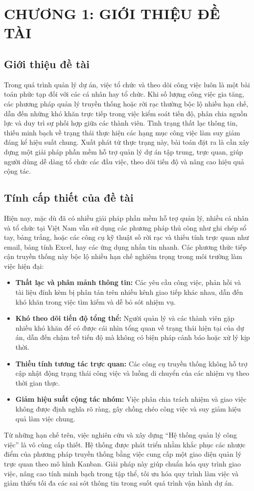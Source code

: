 \section{CHƯƠNG 1: GIỚI THIỆU ĐỀ TÀI}

\subsection{Giới thiệu đề tài}
Trong quá trình quản lý dự án, việc tổ chức và theo dõi công việc luôn là một bài toán phức tạp đối với các cá nhân hay tổ chức. Khi số lượng công việc gia tăng, các phương pháp quản lý truyền thống hoặc rời rạc thường bộc lộ nhiều hạn chế, dẫn đến những khó khăn trực tiếp trong việc kiểm soát tiến độ, phân chia nguồn lực và duy trì sự phối hợp giữa các thành viên. Tình trạng thất lạc thông tin, thiếu minh bạch về trạng thái thực hiện các hạng mục công việc làm suy giảm đáng kể hiệu suất chung. Xuất phát từ thực trạng này, bài toán đặt ra là cần xây dựng một giải pháp phần mềm hỗ trợ quản lý dự án tập trung, trực quan, giúp người dùng dễ dàng tổ chức các đầu việc, theo dõi tiến độ và nâng cao hiệu quả cộng tác.

\subsection{Tính cấp thiết của đề tài}
Hiện nay, mặc dù đã có nhiều giải pháp phần mềm hỗ trợ quản lý, nhiều cá nhân và tổ chức tại Việt Nam vẫn sử dụng các phương pháp thủ công như ghi chép sổ tay, bảng trắng, hoặc các công cụ kỹ thuật số rời rạc và thiếu tính trực quan như email, bảng tính Excel, hay các ứng dụng nhắn tin nhanh. Các phương thức tiếp cận truyền thống này bộc lộ nhiều hạn chế nghiêm trọng trong môi trường làm việc hiện đại:
\begin{itemize}
    \item \textbf{Thất lạc và phân mảnh thông tin:} Các yêu cầu công việc, phản hồi và tài liệu đính kèm bị phân tán trên nhiều kênh giao tiếp khác nhau, dẫn đến khó khăn trong việc tìm kiếm và dễ bỏ sót nhiệm vụ.
    \item \textbf{Khó theo dõi tiến độ tổng thể:} Người quản lý và các thành viên gặp nhiều khó khăn để có được cái nhìn tổng quan về trạng thái hiện tại của dự án, dẫn đến chậm trễ tiến độ mà không có biện pháp cảnh báo hoặc xử lý kịp thời.
    \item \textbf{Thiếu tính tương tác trực quan:} Các công cụ truyền thống không hỗ trợ cập nhật động trạng thái công việc và luồng di chuyển của các nhiệm vụ theo thời gian thực.
    \item \textbf{Giảm hiệu suất cộng tác nhóm:} Việc phân chia trách nhiệm và giao việc không được định nghĩa rõ ràng, gây chồng chéo công việc và suy giảm hiệu quả làm việc chung.
\end{itemize}
Từ những hạn chế trên, việc nghiên cứu và xây dựng ``Hệ thống quản lý công việc'' là vô cùng cấp thiết. Hệ thống được phát triển nhằm khắc phục các nhược điểm của phương pháp truyền thống bằng việc cung cấp một giao diện quản lý trực quan theo mô hình Kanban. Giải pháp này giúp chuẩn hóa quy trình giao việc, nâng cao tính minh bạch trong tập thể, tối ưu hóa quy trình làm việc và giảm thiểu tối đa các sai sót thông tin trong suốt quá trình vận hành dự án.

